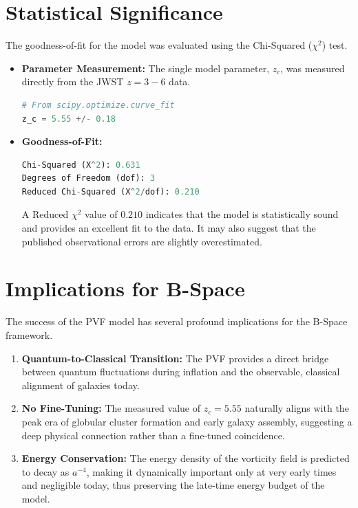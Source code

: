 \documentclass{BSpacePaper} %
\begin{document}
\section{Statistical Significance}
The goodness-of-fit for the model was evaluated using the Chi-Squared ($\chi^2$) test.
\begin{itemize}
    \item \textbf{Parameter Measurement:} The single model parameter, $z_c$, was measured directly from the JWST $z=3-6$ data.
        \begin{lstlisting}[language=Python, caption=Measured Parameter]
# From scipy.optimize.curve_fit
z_c = 5.55 +/- 0.18
        \end{lstlisting}
    \item \textbf{Goodness-of-Fit:}
        \begin{lstlisting}[language=Python, caption=Chi-Squared Test Results]
Chi-Squared (X^2): 0.631
Degrees of Freedom (dof): 3
Reduced Chi-Squared (X^2/dof): 0.210
        \end{lstlisting}
    A Reduced $\chi^2$ value of $0.210$ indicates that the model is statistically sound and provides an excellent fit to the data. It may also suggest that the published observational errors are slightly overestimated.
\end{itemize}

\section{Implications for B-Space}
The success of the PVF model has several profound implications for the B-Space framework.
\begin{enumerate}
    \item \textbf{Quantum-to-Classical Transition:} The PVF provides a direct bridge between quantum fluctuations during inflation and the observable, classical alignment of galaxies today.
    \item \textbf{No Fine-Tuning:} The measured value of $z_c=5.55$ naturally aligns with the peak era of globular cluster formation and early galaxy assembly, suggesting a deep physical connection rather than a fine-tuned coincidence.
    \item \textbf{Energy Conservation:} The energy density of the vorticity field is predicted to decay as $a^{-4}$, making it dynamically important only at very early times and negligible today, thus preserving the late-time energy budget of the model.
\end{enumerate}
\end{document}
